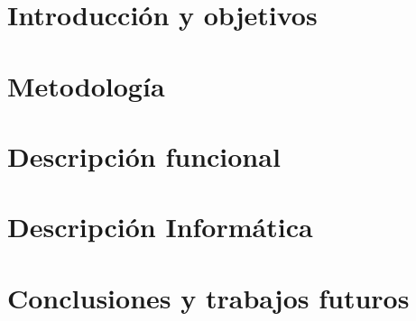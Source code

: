 \documentclass[12pt,twoside,titlepage]{report}
\begin{document}
\setlength{\parskip}{0.75em}
\renewcommand{\baselinestretch}{1.25}
\setcounter{page}{1}


\chapter{Introducción y objetivos}



\blankpage

\chapter{Metodología}



\blankpage

\chapter{Descripción funcional}
\label{cap:funcionalidades}



\clearpage
\blankpage

\chapter{Descripción Informática}
\label{sec:descripcionInformatica}

\minitoc
\clearpage



\blankpage


\chapter{Conclusiones y trabajos futuros}



\blankpage



{}
\end{document}
